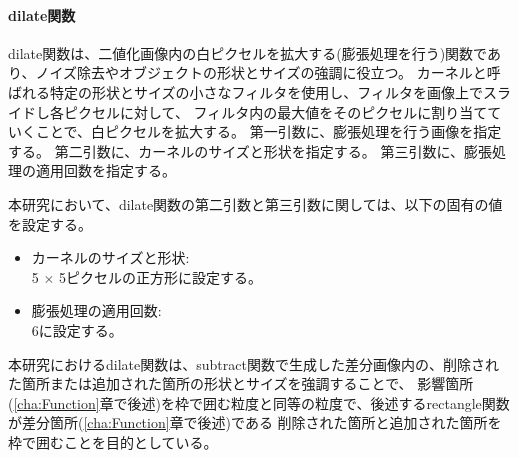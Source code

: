\paragraph{dilate関数}
dilate関数は、二値化画像内の白ピクセルを拡大する(膨張処理を行う)関数であり、ノイズ除去やオブジェクトの形状とサイズの強調に役立つ。
カーネルと呼ばれる特定の形状とサイズの小さなフィルタを使用し、フィルタを画像上でスライドし各ピクセルに対して、
フィルタ内の最大値をそのピクセルに割り当てていくことで、白ピクセルを拡大する。
第一引数に、膨張処理を行う画像を指定する。
第二引数に、カーネルのサイズと形状を指定する。
第三引数に、膨張処理の適用回数を指定する。
\par
本研究において、dilate関数の第二引数と第三引数に関しては、以下の固有の値を設定する。
\begin{itemize}
      \setlength{\itemsep}{0pt}
            \setlength{\parsep}{0pt}
      \item カーネルのサイズと形状:\\
            5 $\times$ 5ピクセルの正方形に設定する。
      \item 膨張処理の適用回数:\\
            $6$に設定する。
\end{itemize}
\par
本研究におけるdilate関数は、subtract関数で生成した差分画像内の、削除された箇所または追加された箇所の形状とサイズを強調することで、
影響箇所(\ref{cha:Function}章で後述)を枠で囲む粒度と同等の粒度で、後述するrectangle関数が差分箇所(\ref{cha:Function}章で後述)である
削除された箇所と追加された箇所を枠で囲むことを目的としている。
